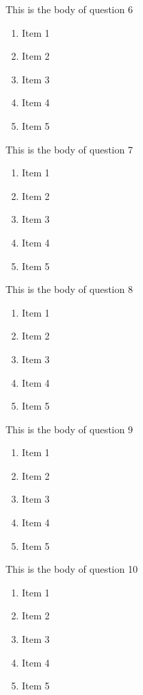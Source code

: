 \documentclass{article}
\begin{document}
This is the body of question 6
\begin{enumerate}
    \item
    Item 1
    \item
    Item 2
    \item
    Item 3
    \item
    Item 4
    \item
    Item 5
\end{enumerate}


This is the body of question 7
\begin{enumerate}
    \item
    Item 1
    \item
    Item 2
    \item
    Item 3
    \item
    Item 4
    \item
    Item 5
\end{enumerate}

This is the body of question 8
\begin{enumerate}
    \item
    Item 1
    \item
    Item 2
    \item
    Item 3
    \item
    Item 4
    \item
    Item 5
\end{enumerate}

This is the body of question 9
\begin{enumerate}
    \item
    Item 1
    \item
    Item 2
    \item
    Item 3
    \item
    Item 4
    \item
    Item 5
\end{enumerate}

This is the body of question 10
\begin{enumerate}
    \item
    Item 1
    \item
    Item 2
    \item
    Item 3
    \item
    Item 4
    \item
    Item 5
\end{enumerate}
\end{document}
